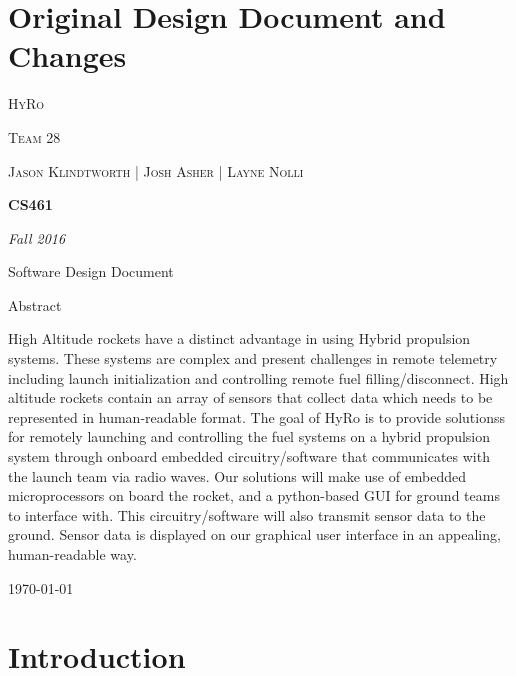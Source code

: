 \documentclass[10pt,draftclsnofoot,onecolumn,retainorgcmds]{IEEEtran}
\begin{document}
\section{Original Design Document and Changes}
\begin{titlepage}
	\centering
	{\scshape\LARGE HyRo \par}
	{\scshape\LARGE Team 28\par}
	\vspace{1cm}
	{\scshape\Large Jason Klindtworth  |  Josh Asher  |   Layne Nolli}
	\noindent\makebox[\linewidth]{\rule{17cm}{2pt}}
	\vspace{1cm}
	{\huge\bfseries CS461\par}
	\vspace{2cm}
	{\Large\itshape Fall 2016\par}
	\vspace{4cm}
	{\large Software Design Document\par}\vspace{2cm}
	{\large Abstract\par}
	\vspace{1cm}
	High Altitude rockets have a distinct advantage in using Hybrid propulsion systems. These systems are complex and present challenges in remote telemetry including launch initialization and controlling remote fuel filling/disconnect. High altitude rockets contain an array of sensors that collect data which needs to be represented in human-readable format. The goal of HyRo is to provide solutionss for remotely launching and controlling the fuel systems on a hybrid propulsion system through onboard embedded circuitry/software that communicates with the launch team via radio waves. Our solutions will make use of embedded microprocessors on board the rocket, and a python-based GUI for ground teams to interface with. This circuitry/software will also transmit sensor data to the ground. Sensor data is displayed on our graphical user interface in an appealing, human-readable way. \par
	
	\noindent\makebox[\linewidth]{\rule{17cm}{2pt}}
	\vfill
	
	{\large \today\par}
\end{titlepage}


\setcounter{tocdepth}{2}

\section{Introduction}
\end{document}

